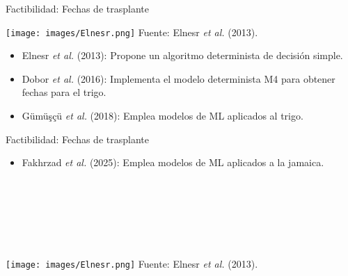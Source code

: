 \documentclass[aspectratio=169]{beamer}
\begin{document}
\begin{frame}{Factibilidad: Fechas de trasplante}
	\begin{minipage}{0.5\textwidth}
		\hspace{-0.5cm}
		\centering
		\texttt{[image: images/Elnesr.png]}
		{\scriptsize Fuente: Elnesr \textit{et al.} (2013).}
	\end{minipage}%
	\begin{minipage}{0.5\textwidth}
		\begin{block}{}
			\begin{itemize}
				\item Elnesr \textit{et al.} (2013): Propone un algoritmo determinista de decisión simple.
				\item Dobor \textit{et al.} (2016): Implementa el modelo determinista M4 para obtener fechas para el trigo.
				\item Gümüşçü \textit{et al.} (2018): Emplea modelos de ML aplicados al trigo.
			\end{itemize}
		\end{block}
	\end{minipage}
\end{frame}

\begin{frame}{Factibilidad: Fechas de trasplante}
	\begin{minipage}{0.5\textwidth}
		\begin{block}{}
			\begin{itemize}
				\item Fakhrzad \textit{et al.} (2025): Emplea modelos de ML aplicados a la jamaica.
			\end{itemize}
			\phantom{.}\\
			\phantom{.}\\
			\phantom{.}\\
			\phantom{.}\\
			\phantom{.}\\
		\end{block}
	\end{minipage}%
	\begin{minipage}{0.5\textwidth}
		\hspace{0cm}
		\centering
		\texttt{[image: images/Elnesr.png]}
		{\scriptsize Fuente: Elnesr \textit{et al.} (2013).}
	\end{minipage}%
\end{frame}
\end{document}
